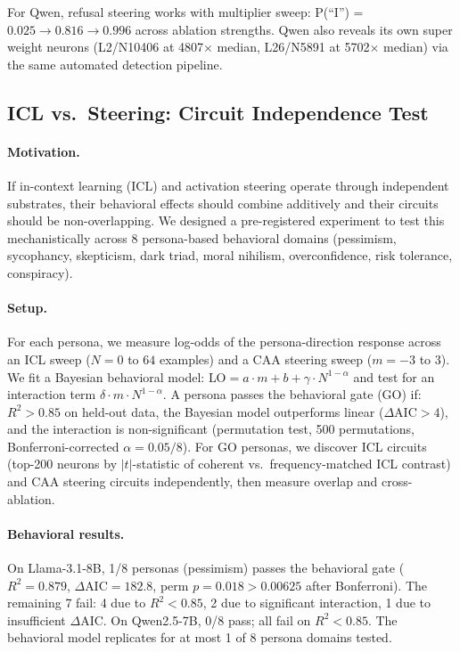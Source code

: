 \documentclass[11pt]{article}
\begin{document}
For Qwen, refusal steering works with multiplier sweep: P(``I'') = $0.025 \to 0.816 \to 0.996$ across ablation strengths.
Qwen also reveals its own super weight neurons (L2/N10406 at 4807$\times$ median, L26/N5891 at 5702$\times$ median) via the same automated detection pipeline.


\subsection{ICL vs.\ Steering: Circuit Independence Test}
\label{sec:icl_steering}

\paragraph{Motivation.}
If in-context learning (ICL) and activation steering operate through independent substrates, their behavioral effects should combine additively and their circuits should be non-overlapping.
We designed a pre-registered experiment to test this mechanistically across 8 persona-based behavioral domains (pessimism, sycophancy, skepticism, dark triad, moral nihilism, overconfidence, risk tolerance, conspiracy).

\paragraph{Setup.}
For each persona, we measure log-odds of the persona-direction response across an ICL sweep ($N = 0$ to $64$ examples) and a CAA steering sweep ($m = -3$ to $3$).
We fit a Bayesian behavioral model:
$\text{LO} = a \cdot m + b + \gamma \cdot N^{1-\alpha}$
and test for an interaction term $\delta \cdot m \cdot N^{1-\alpha}$.
A persona passes the behavioral gate (GO) if: $R^2 > 0.85$ on held-out data, the Bayesian model outperforms linear ($\Delta\text{AIC} > 4$), and the interaction is non-significant (permutation test, 500 permutations, Bonferroni-corrected $\alpha = 0.05/8$).
For GO personas, we discover ICL circuits (top-200 neurons by $|t|$-statistic of coherent vs.\ frequency-matched ICL contrast) and CAA steering circuits independently, then measure overlap and cross-ablation.

\paragraph{Behavioral results.}
On Llama-3.1-8B, 1/8 personas (pessimism) passes the behavioral gate ($R^2 = 0.879$, $\Delta\text{AIC} = 182.8$, perm $p = 0.018 > 0.00625$ after Bonferroni).
The remaining 7 fail: 4 due to $R^2 < 0.85$, 2 due to significant interaction, 1 due to insufficient $\Delta\text{AIC}$.
On Qwen2.5-7B, 0/8 pass; all fail on $R^2 < 0.85$.
The behavioral model replicates for at most 1 of 8 persona domains tested.
\end{document}
